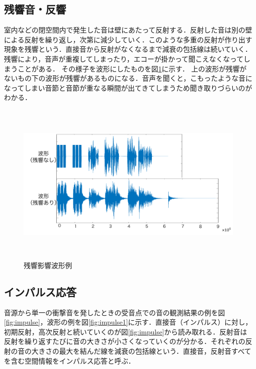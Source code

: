 \documentclass[a4j,11pt]{jsarticle}
\begin{document}
\subsection{残響音・反響}
室内などの閉空間内で発生した音は壁にあたって反射する．反射した音は別の壁による反射を繰り返し，次第に減少していく．このような多重の反射が作り出す現象を残響という．直接音から反射がなくなるまで減衰の包括線は続いていく．
残響により，音声が重複してしまったり，エコーが掛かって聞こえなくなってしまうことがある．
その様子を波形にしたものを図\ref{fig:hakei}に示す．
上の波形が残響がないもの下の波形が残響があるものになる．音声を聞くと，こもったような音になってしまい音節と音節が重なる瞬間が出てきてしまうため聞き取りづらいのがわかる．
\begin{figure}[h]
\begin{center}
 \includegraphics[clip,width=130mm,height=80mm]{hakeikekka.pdf}
\end{center}
 \caption{残響影響波形例}
 \label{fig:hakei}
\end{figure}

\newpage

\subsection{インパルス応答}
音源から単一の衝撃音を発したときの受音点での音の観測結果の例を図\ref{fig:impulse}，波形の例を図\ref{fig:impulse1}に示す．直接音（インパルス）に対し，初期反射，高次反射と続いていくのが図\ref{fig:impulse}から読み取れる．反射音は反射を繰り返すたびに音の大きさが小さくなっていくのが分かる．それぞれの反射の音の大きさの最大を結んだ線を減衰の包括線という．直接音，反射音すべてを含む空間情報をインパルス応答と呼ぶ\cite{oka3}．
\end{document}
